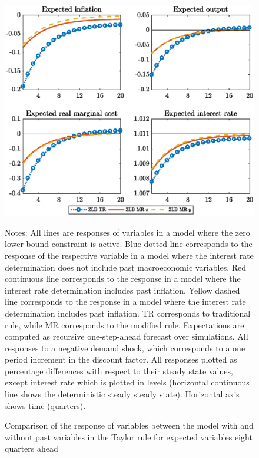 \documentclass[11pt]{article}
\numberwithin{equation}{section}
\begin{document}
\begin{figure}[H]
	\centering
	\caption{Comparison of the response of variables between the model with and without past variables in the Taylor rule for expected variables eight quarters ahead}\label{fig:irfCompExp8_pref}
	\includegraphics[scale=.6]{irfCompExp8_pref}
	\begin{minipage}{\linewidth}
    	\vspace{1mm}
	\footnotesize{{\sc Notes:} All lines are responses of variables in a model where the zero lower bound constraint is active. Blue dotted line corresponds to the response of the respective variable in a model where the interest rate determination does not include past macroeconomic variables. Red continuous line corresponds to the response in a model where the interest rate determination includes past inflation. Yellow dashed line corresponds to the response in a model where the interest rate determination includes past inflation. TR corresponds to traditional rule, while MR corresponds to the modified rule. Expectations are computed as recursive one-step-ahead forecast over simulations. All responses to a negative demand shock, which corresponds to a one period increment in the discount factor. All responses plotted as percentage differences with respect to their steady state values, except interest rate which is plotted in levels (horizontal continuous line shows the deterministic steady steady state). Horizontal axis shows time (quarters).}
	\end{minipage}
\end{figure}
\end{document}
